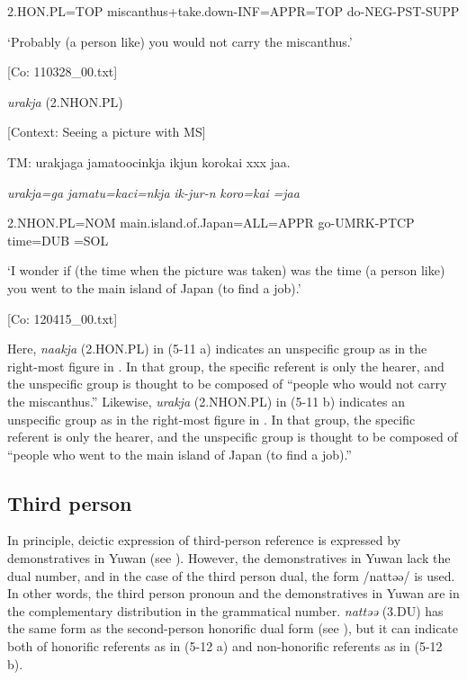       2.HON.PL=TOP  miscanthus+take.down-INF=APPR=TOP  do-NEG-PST-SUPP

      ‘Probably (a person like) you would not carry the miscanthus.’

      [Co: 110328\_00.txt]

 \ex \label{ex:5:b} \textit{urakja} (2.NHON.PL)

    [Context: Seeing a picture with MS]

    TM:  urakjaga  jamatoocinkja  ikjun  {\textbar}koro{\textbar}kai  xxx  jaa.

      \textit{urakja=ga}  \textit{jamatu=kaci=nkja} \textit{ik-jur-n}  \textit{koro=kai}    \textit{=jaa}
                                                   
      2.NHON.PL=NOM  main.island.of.Japan=ALL=APPR  go-UMRK-PTCP  time=DUB    =SOL

      ‘I wonder if (the time when the picture was taken) was the time (a person like) you went to the main island of Japan (to find a job).’

      [Co: 120415\_00.txt]
      \z
      \z

Here, \textit{naakja} (2.HON.PL) in (5-11 a) indicates an unspecific group as in the right-most figure in . In that group, the specific referent is only the hearer, and the unspecific group is thought to be composed of “people who would not carry the miscanthus.” Likewise, \textit{urakja} (2.NHON.PL) in (5-11 b) indicates an unspecific group as in the right-most figure in . In that group, the specific referent is only the hearer, and the unspecific group is thought to be composed of “people who went to the main island of Japan (to find a job).”

\subsection{Third person}

In principle, deictic expression of third-person reference is expressed by demonstratives in Yuwan (see ). However, the demonstratives in Yuwan lack the dual number, and in the case of the third person dual, the form /nattəə/ is used. In other words, the third person pronoun and the demonstratives in Yuwan are in the complementary distribution in the grammatical number. \textit{nattəə} (3.DU) has the same form as the second-person honorific dual form (see ), but it can indicate both of honorific referents as in (5-12 a) and non-honorific referents as in (5-12 b).

